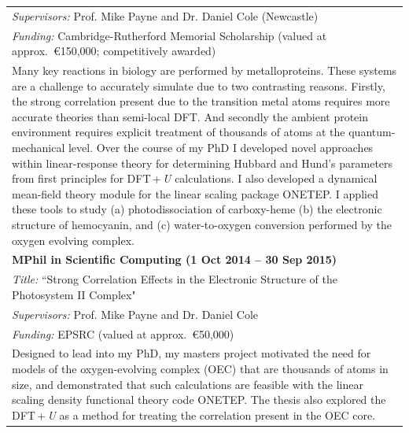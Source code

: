 \documentclass[10pt,a4paper,final]{article}
\begin{document}
\begin{tabularx}{\textwidth}{X}
   \\
   \cellcolor{seaborn_bg_grey}%
   \textit{Supervisors:} Prof. Mike Payne and Dr. Daniel Cole (Newcastle)
   \\
   \cellcolor{seaborn_bg_grey}%
   \textit{Funding:} Cambridge-Rutherford Memorial Scholarship (valued at approx.\ \euro{}150,000; competitively awarded)
   \\
   \cellcolor{seaborn_bg_grey}%
   Many key reactions in biology are performed by metalloproteins. These systems are a challenge to accurately simulate due to two contrasting reasons. Firstly, the strong correlation present due to the transition metal atoms requires more accurate theories than semi-local DFT. And secondly the ambient protein environment requires explicit treatment of thousands of atoms at the quantum-mechanical level. Over the course of my PhD I developed novel approaches within linear-response theory for determining Hubbard and Hund's parameters from first principles for DFT\,+\,\emph{U} calculations. I also developed a dynamical mean-field theory module for the linear scaling package ONETEP. I applied these tools to study (a) photodissociation of carboxy-heme (b) the electronic structure of hemocyanin, and (c) water-to-oxygen conversion performed by the oxygen evolving complex.
   \\
   \rowcolor{seaborn_bg_grey}
   \textbf{MPhil in Scientific Computing (1 Oct 2014 -- 30 Sep 2015)}
   \\%
   \rowcolor{seaborn_bg_grey}

   \textit{Title:} ``Strong Correlation Effects in the Electronic Structure of the Photosystem II Complex"
   \\
   \rowcolor{seaborn_bg_grey}%

   \textit{Supervisors:} Prof. Mike Payne and Dr. Daniel Cole
   \\
   \rowcolor{seaborn_bg_grey}%

   \textit{Funding:} EPSRC (valued at approx.\ \euro{}50,000)
   \\
   \rowcolor{seaborn_bg_grey}

   Designed to lead into my PhD, my masters project motivated the need for models of the oxygen-evolving complex (OEC) that are thousands of atoms in size, and demonstrated that such calculations are feasible with the linear scaling density functional theory code ONETEP. The thesis also explored the DFT\,+\,\emph{U} as a method for treating the correlation present in the OEC core.
   \\
\end{tabularx}
\end{document}
